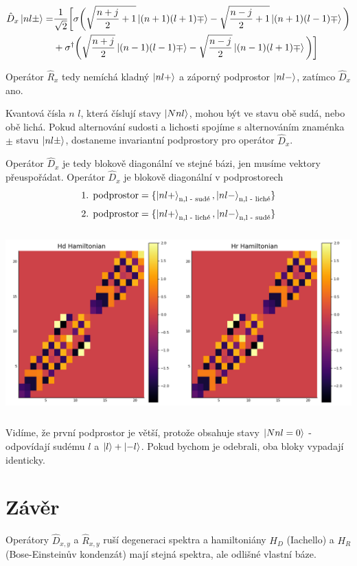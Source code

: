 \documentclass{article}
\begin{document}
\begin{align*}
    \hat{D}_x \ket{nl\pm} =&
\frac{1}{\sqrt{2}}\bigg[
\sigma \bigg(\sqrt{\frac{n + j}{2} + 1} \ket{(n+1) (l+1) \mp} - \sqrt{\frac{n - j}{2} + 1} \ket{(n+1) (l-1) \mp}\bigg)  \\
 &+\sigma^{\dagger} \bigg(\sqrt{\frac{n + j}{2}} \ket{(n-1) (l-1) \mp} - \sqrt{\frac{n - j}{2}} \ket{(n-1) (l+1) \mp}\bigg)   
\bigg]
\end{align*}

Operátor $\hat{R}_x$ tedy nemíchá kladný $\ket{nl+}$ a záporný podprostor $\ket{nl-}$, zatímco $\hat{D}_x$ ano. 

Kvantová čísla $n$ $l$, která číslují
stavy $\ket{Nnl}$, mohou být ve stavu obě sudá, nebo obě lichá. Pokud alternování sudosti a lichosti spojíme
s alternováním znaménka $\pm$ stavu  $\ket{nl\pm}$, dostaneme invariantní podprostory pro operátor 
$\hat{D}_x$.

Operátor $\hat{D}_x$ je tedy blokově diagonální ve stejné bázi, jen musíme vektory přeuspořádat.
Operátor $\hat{D}_x$ je blokově diagonální v podprostorech  
$$\text{1. podprostor} = \{\ket{nl+}_{\text{n,l - sudé}}, \ket{nl-}_{\text{n,l - liché}}\}$$
$$\text{2. podprostor} = \{\ket{nl+}_{\text{n,l - liché}}, \ket{nl-}_{\text{n,l - sudé}}\}$$

\begin{center}
    \includegraphics[width=16cm, height=7cm]{Figure_1.png}
\end{center}

Vidíme, že první podprostor je větší, protože obsahuje stavy $\ket{Nnl = 0}$ - odpovídají sudému $l$ a $\ket{l} + \ket{-l}$. Pokud
bychom je odebrali, oba bloky vypadají identicky.

\section{Závěr}
    Operátory $\hat{D}_{x,y}$ a $\hat{R}_{x,y}$ ruší degeneraci spektra a hamiltoniány $H_D$ (Iachello) a $H_R$ (Bose-Einsteinův kondenzát)
    mají stejná spektra, ale odlišné vlastní báze. 
     
\end{document}
